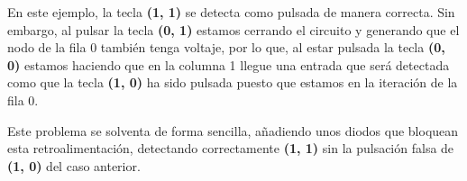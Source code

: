     En este ejemplo, la tecla \textbf{(1, 1)} se detecta como pulsada de manera correcta. Sin embargo, al pulsar la tecla \textbf{(0, 1)} estamos cerrando el circuito y generando que el nodo de la fila 0 también tenga voltaje, por lo que, al estar pulsada la tecla \textbf{(0, 0)} estamos haciendo que en la columna 1 llegue una entrada que será detectada como que la tecla \textbf{(1, 0)} ha sido pulsada puesto que estamos en la iteración de la fila 0.\vspace{0.2cm}\par

    Este problema se solventa de forma sencilla, añadiendo unos diodos que bloquean esta retroalimentación, detectando correctamente \textbf{(1, 1)} sin la pulsación falsa de \textbf{(1, 0)} del caso anterior.
